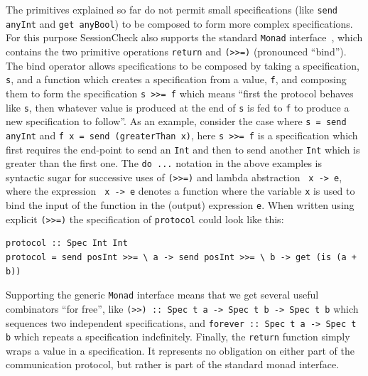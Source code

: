 \documentclass{article}
\begin{document}
The primitives explained so far do not permit small specifications
(like \texttt{send anyInt} and \texttt{get anyBool}) to be composed to
form more complex specifications.
%
For this purpose SessionCheck also supports the standard \texttt{Monad} interface~\cite{WadlerMonad}, which contains the
two primitive operations \texttt{return} and \texttt{(>>=)} (pronounced ``bind'').
%
The bind operator allows specifications to be composed by taking a specification, \texttt{s}, and a function which
creates a specification from a value, \texttt{f}, and composing them to form the specification \texttt{s >>= f} which means
``first the protocol behaves like \texttt{s}, then whatever value is produced at the end of \texttt{s} is fed to \texttt{f} to produce
a new specification to follow''.
%
As an example, consider the case where \texttt{s = send anyInt} and \texttt{f x = send (greaterThan x)}, here \texttt{s >>= f} is
a specification which first requires the end-point to send an \texttt{Int} and then to send another \texttt{Int} which is greater
than the first one.
%
The \texttt{do ...} notation in the above examples is syntactic sugar for successive uses of \texttt{(>>=)} and lambda abstraction
\texttt{\ x -> e}, where the expression \texttt{\ x -> e} denotes a function where the variable \texttt{x} is used to bind the input of
the function in the (output) expression \texttt{e}.
%
When written using explicit \texttt{(>>=)} the specification of \texttt{protocol} could look like this:
%
\begin{verbatim}
protocol :: Spec Int Int
protocol = send posInt >>= \ a -> send posInt >>= \ b -> get (is (a + b))
\end{verbatim}


%
Supporting the generic \texttt{Monad} interface means that we get several useful combinators ``for free'', like
\texttt{(>>) :: Spec t a -> Spec t b -> Spec t b} which sequences two independent specifications, and
\texttt{forever :: Spec t a -> Spec t b} which repeats a specification indefinitely.
%
Finally, the \texttt{return} function simply wraps a value in a specification.
%
It represents no obligation on either part of the communication protocol, but rather is part of the standard
monad interface.
%
\end{document}
